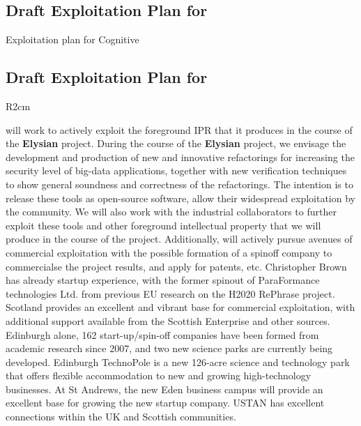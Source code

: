 \documentclass[a4paper,11pt]{article}
\newcommand{\project}[1]{\textbf{#1}\xspace}
\newcommand{\SECURITY}{\project{Elysian}}
\newcommand{\TheProject}{\SECURITY}
\begin{document}
\horizontalline

\pagebreak

\subsection*{Draft Exploitation Plan for \COGNIshort{}}
\vspace{-6pt}


Exploitation plan for Cognitive

\horizontalline

\subsection*{Draft Exploitation Plan for \SAshort{}}

\begin{wrapfigure}{R}{2cm}
\vspace{-1.4cm}
\hfill {}
\vspace{-0.9cm}
\end{wrapfigure}

\SAshort{} will work to actively exploit the foreground IPR that it produces in the course of the \TheProject{} project. During the course of the \TheProject{} project, we envisage the development and production of new and innovative refactorings for increasing the security level of big-data applications, together with new verification techniques to show general soundness and correctness of the refactorings. The intention is to release these tools as open-source software, allow their widespread exploitation by the community. We will also work with the industrial collaborators to further exploit these tools and other foreground intellectual property that we will produce in the course of the project. 
Additionally, \SAshort{} will actively pursue avenues of commercial exploitation with the possible formation of a spinoff company to commercialse the project results, and apply for patents, etc. Christopher Brown has already startup experience, with the former spinout of ParaFormance technologies Ltd. from previous EU research on the H2020 RePhrase project. Scotland provides an excellent and vibrant base for commercial exploitation, with additional support available from the Scottish Enterprise and other sources.  Edinburgh alone, 162 start-up/spin-off companies have been formed from academic research since 2007, and two new science parks are currently being developed. Edinburgh TechnoPole is a new 126-acre science and technology park that offers flexible accommodation to new and growing high-technology businesses. At St Andrews, the new Eden business campus will provide an excellent base for growing the new startup company. USTAN has excellent connections within the UK and Scottish communities.
\end{document}
